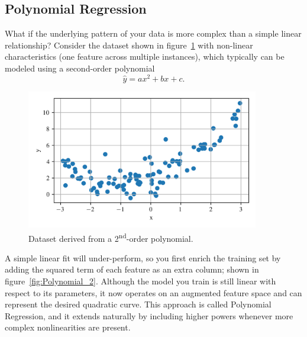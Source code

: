 \documentclass[12pt,letter]{article}
\begin{document}
\subsection{Polynomial Regression }





What if the underlying pattern of your data is more complex than a simple linear relationship? Consider the dataset shown in figure~\ref{fig:Polynomial_1} with non-linear characteristics (one feature across multiple instances), which typically can be modeled using a second-order polynomial
\begin{equation}
\hat{y}=ax^2+bx+c.
\label{eq:poly}
\end{equation}


\begin{figure}[H]
	\centering
	\includegraphics[width=4in]{../figures/polynomial_regression_1}
	\caption{Dataset derived from a 2\textsuperscript{nd}-order polynomial.}
	\label{fig:Polynomial_1}
\end{figure}


A simple linear fit will under-perform, so you first enrich the training set by adding the squared term of each feature as an extra column; shown in figure~\ref{fig:Polynomial_2}. Although the model you train is still linear with respect to its parameters, it now operates on an augmented feature space and can represent the desired quadratic curve. This approach is called Polynomial Regression, and it extends naturally by including higher powers whenever more complex nonlinearities are present.
\end{document}
